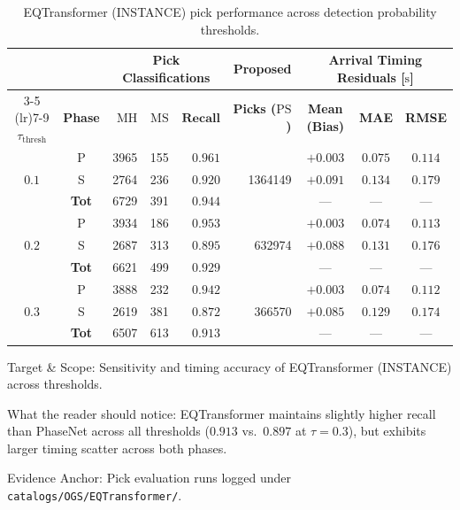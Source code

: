 \begin{table}[htbp]
  \centering
  \small
  \caption{EQTransformer (INSTANCE) pick performance across detection probability thresholds.}
  \label{tab:eqt_threshold_sweep}
  \begin{threeparttable}
    \begin{tabularx}{\linewidth}{c c r r r r c c c}
      \toprule
      & & \multicolumn{3}{c}{\textbf{Pick Classifications}} & \textbf{Proposed} & \multicolumn{3}{c}{\textbf{Arrival Timing Residuals [$\unit{\second}$]}} \\
      \cmidrule(lr){3-5} \cmidrule(lr){7-9}
      $\tau_{\mathrm{thresh}}$ & \textbf{Phase} & $\mathrm{MH}$ & $\mathrm{MS}$ & $\mathbf{Recall}$ & \textbf{Picks ($\mathrm{PS}$)} & \textbf{Mean (Bias)} & \textbf{MAE} & \textbf{RMSE} \\
      \midrule
      \multirow{3}{*}{$0.1$} & P & \num{3965} & \num{155} & $0.961$ & \multirow{3}{*}{\num{1364149}} & $+0.003$ & $0.075$ & $0.114$ \\
      & S & \num{2764} & \num{236} & $0.920$ & & $+0.091$ & $0.134$ & $0.179$ \\
      & \textbf{Tot} & \num{6729} & \num{391} & $\mathbf{0.944}$ & & --- & --- & --- \\
      \midrule
      \multirow{3}{*}{$0.2$} & P & \num{3934} & \num{186} & $0.953$ & \multirow{3}{*}{\num{632974}} & $+0.003$ & $0.074$ & $0.113$ \\
      & S & \num{2687} & \num{313} & $0.895$ & & $+0.088$ & $0.131$ & $0.176$ \\
      & \textbf{Tot} & \num{6621} & \num{499} & $\mathbf{0.929}$ & & --- & --- & --- \\
      \midrule
      \multirow{3}{*}{$0.3$} & P & \num{3888} & \num{232} & $0.942$ & \multirow{3}{*}{\num{366570}} & $+0.003$ & $0.074$ & $0.112$ \\
      & S & \num{2619} & \num{381} & $0.872$ & & $+0.085$ & $0.129$ & $0.174$ \\
      & \textbf{Tot} & \num{6507} & \num{613} & $\mathbf{0.913}$ & & --- & --- & --- \\
      \bottomrule
    \end{tabularx}
    \begin{tablenotes}[flushleft]
      \footnotesize
      \item Target \& Scope: Sensitivity and timing accuracy of EQTransformer (INSTANCE) across thresholds.
      \item What the reader should notice: EQTransformer maintains slightly higher recall than PhaseNet across all thresholds ($0.913$ vs.\ $0.897$ at $\tau=0.3$), but exhibits larger timing scatter across both phases.
      \item Evidence Anchor: Pick evaluation runs logged under \texttt{catalogs/OGS/EQTransformer/}.
    \end{tablenotes}
  \end{threeparttable}
\end{table}


